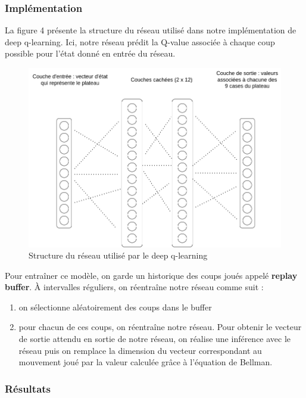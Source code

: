 \documentclass[french]{article}
\begin{document}
    \subsubsection{Implémentation}
    La figure 4 présente la structure du réseau utilisé dans notre implémentation de deep q-learning. Ici, notre réseau prédit la Q-value associée à chaque coup possible pour l'état donné en entrée du réseau.
    \begin{figure}[h]
        \includegraphics[width=13cm]{structure_dnn}
        \centering
        \caption{Structure du réseau utilisé par le deep q-learning}
        \centering
    \end{figure}

    

    Pour entraîner ce modèle, on garde un historique des coups joués appelé \textbf{replay buffer}. À intervalles réguliers, on réentraîne notre réseau comme suit :
    \begin{enumerate}
        \item on sélectionne aléatoirement des coups dans le buffer
        \item pour chacun de ces coups, on réentraîne notre réseau. Pour obtenir le vecteur de sortie attendu en sortie de notre réseau, on réalise une inférence avec le réseau puis on remplace la dimension du vecteur correspondant au mouvement joué par la valeur calculée grâce à l'équation de Bellman.
    \end{enumerate}

    \subsubsection{Résultats}
\end{document}
